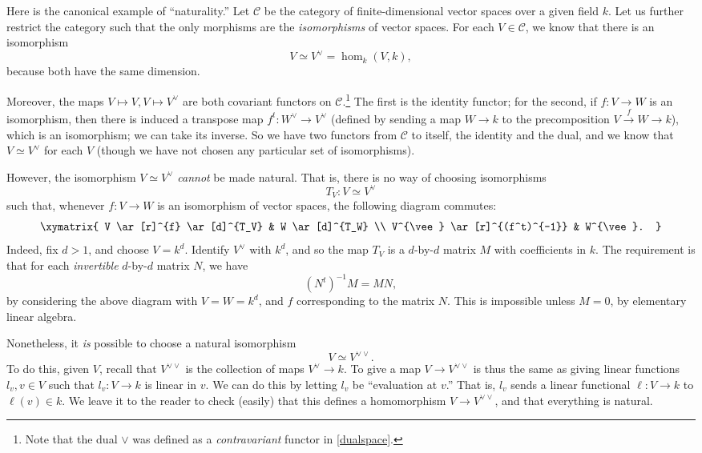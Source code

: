 \begin{example}
Here is the canonical example of ``naturality.''
Let $\mathcal{C}$ be the category of finite-dimensional vector spaces over a
given field $k$. Let us further restrict the category such that the only
morphisms are the \emph{isomorphisms} of vector spaces.
For each $V \in \mathcal{C}$, we know that there is an isomorphism
\[ V \simeq V^{\vee} = \hom_k(V, k),  \]
because both have the same dimension. 

Moreover, the maps $V \mapsto V, V \mapsto V^{\vee}$ are both covariant functors on
$\mathcal{C}$.\footnote{Note that the dual $\vee$ was defined as a
\emph{contravariant} functor in \cref{dualspace}.} The first is the identity functor; for the second, if $f: V \to
W$ is an isomorphism, then there is induced a transpose map $f^t: W^{\vee} \to V^{\vee}$
(defined by sending a map $W \to k$ to the precomposition $V \stackrel{f}{\to}
W \to k$), which is an isomorphism; we can take its inverse.
So we have two functors from $\mathcal{C}$ to itself, the identity and the
dual, and we know that $V \simeq V^{\vee}$ for each $V$ (though we have not
chosen any particular set of isomorphisms).


However, the isomorphism $V \simeq
V^{\vee}$ \emph{cannot} be made natural. That is, there is no way of choosing
isomorphisms
\[ T_V: V \simeq V^{\vee}  \]
such that, 
whenever $f: V \to W$ is an isomorphism of vector spaces, the following diagram
commutes:
\[ \xymatrix{
V \ar[r]^{f} \ar[d]^{T_V}  &  W \ar[d]^{T_W} \\
V^{\vee} \ar[r]^{(f^t)^{-1}} &  W^{\vee}.
}\]
Indeed, fix $d>1$, and choose $V = k^d$. 
Identify $V^{\vee}$ with $k^d$, and so the map $T_V$ is a $d$-by-$d$ matrix $M$
with coefficients in $k$. The requirement is that for each \emph{invertible}
$d$-by-$d$ matrix $N$, we have
\[ (N^t)^{-1}M = MN,  \]
by considering the above diagram with $V = W = k^d$, and $f$ corresponding to
the matrix $N$.
This is impossible unless $M = 0$, by elementary linear algebra.

Nonetheless, it \emph{is} possible to choose a natural isomorphism
\[ V \simeq V^{\vee \vee}.  \]
To do this, given $V$, recall that $V^{\vee \vee}$ is the collection of maps
$V^{\vee} \to k$. To give a map $V \to V^{\vee \vee}$ is thus the same as
giving linear functions $l_v, v \in V$ such that $l_v: V \to k$ is linear in
$v$. We can do this by letting $l_v$ be ``evaluation at $v$.''
That is, $l_v$ sends a linear functional $\ell: V \to k$ to $\ell(v) \in k$. We
leave it to the reader to check (easily) that this defines a homomorphism $V
\to V^{\vee \vee}$, and that everything is natural.
\end{example}






